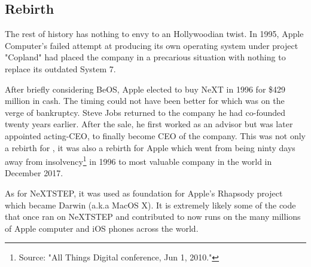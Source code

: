 \subsection{Rebirth}
The rest of \NeXT history has nothing to envy to an Hollywoodian twist. In 1995, Apple Computer's failed attempt at producing its own operating system under project "Copland" had placed the company in a precarious situation with nothing to replace its outdated System 7.\\
\par
 After briefly considering BeOS, Apple elected to buy NeXT in 1996 for \$429 million in cash. The timing could not have been better for \NeXT which was on the verge of bankruptcy. Steve Jobs returned to the company he had co-founded twenty years earlier. After the sale, he first worked as an advisor but was later appointed acting-CEO, to finally become CEO of the company. This was not only a rebirth for \NeXTns, it was also a rebirth for Apple which went from being ninty days away from insolvency\footnote{Source: "All Things Digital conference, Jun 1, 2010."} in 1996 to most valuable company in the world in December 2017. \\
\par
As for NeXTSTEP, it was used as foundation for Apple's Rhapsody project which became Darwin (a.k.a MacOS X). It is extremely likely some of the code that once ran on NeXTSTEP and contributed to \doom{} now runs on the many millions of Apple computer and iOS phones across the world.\\



